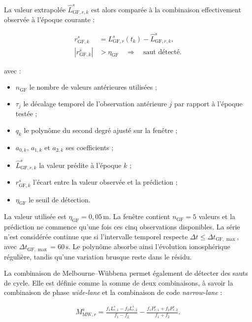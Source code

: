 La valeur extrapolée $\widehat L_{\mathrm{GF},r,k}^s$ est alors comparée à la
combinaison effectivement observée à l'époque courante :

\begin{align}
r_{\mathrm{GF},k}^s
&=
L_{\mathrm{GF},r}^s(t_k)-\widehat L_{\mathrm{GF},r,k}^s,
\\
\left|r_{\mathrm{GF},k}^s\right|
&>\eta_{\mathrm{GF}}
\quad\Longrightarrow\quad
\text{saut détecté}.
\label{ann:eq:geometry_free_detection}
\end{align}

avec :

\begin{itemize}
    \item $n_{\mathrm{GF}}$ le nombre de valeurs antérieures utilisées ;
    \item $\tau_j$ le décalage temporel de l'observation antérieure $j$ par
    rapport à l'époque testée ;
    \item $q_k$ le polynôme du second degré ajusté sur la fenêtre ;
    \item $a_{0,k}$, $a_{1,k}$ et $a_{2,k}$ ses coefficients ;
    \item $\widehat L_{\mathrm{GF},r,k}^s$ la valeur prédite à l'époque $k$ ;
    \item $r_{\mathrm{GF},k}^s$ l'écart entre la valeur observée et la
    prédiction ;
    \item $\eta_{\mathrm{GF}}$ le seuil de détection.
\end{itemize}

La valeur utilisée est $\eta_{\mathrm{GF}}=0{,}05\,\mathrm{m}$. La fenêtre
contient $n_{\mathrm{GF}}=5$ valeurs et la prédiction ne commence qu'une fois
ces cinq observations disponibles. La série n'est considérée continue que si
l'intervalle temporel respecte
$\Delta t\leq\Delta t_{\mathrm{GF},\max}$, avec
$\Delta t_{\mathrm{GF},\max}=60\,\mathrm{s}$. Le polynôme absorbe ainsi
l'évolution ionosphérique régulière, tandis qu'une variation brusque reste
dans le résidu.

La combinaison de Melbourne--Wübbena permet également de détecter des sauts de cycle.
Elle est définie comme la somme de deux combinaisons, à savoir la combinaison de phase
\textit{wide-lane} et la combinaison de code \textit{narrow-lane} :

\begin{align}
M_{\mathrm{MW},r}^s
=
\frac{f_1L_{r,1}^s-f_2L_{r,2}^s}{f_1-f_2}
-
\frac{f_1P_{r,1}^s+f_2P_{r,2}^s}{f_1+f_2}.
\label{ann:eq:melbourne_wubbena_slip}
\end{align}

